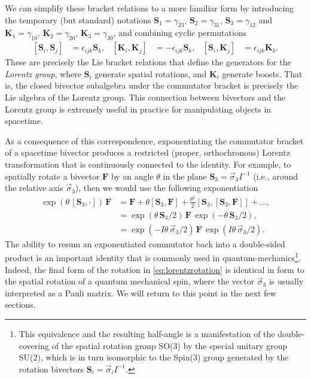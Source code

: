 \documentclass[1p,sort&compress]{elsarticle}
\numberwithin{equation}{section}
\newcommand{\rv}[1]{\vec{#1}}
\newcommand{\bv}[1]{\mathbf{#1}}
\begin{document}
We can simplify these bracket relations to a more familiar form by introducing the temporary (but standard) notations $\bv{S}_1 = \gamma_{23}$, $\bv{S}_2 = \gamma_{31}$, $\bv{S}_3 = \gamma_{12}$ and $\bv{K}_1 = \gamma_{10}$, $\bv{K}_2 = \gamma_{20}$, $\bv{K}_3 = \gamma_{30}$, and combining cyclic permutations
\begin{align}\label{eq:lorentzbrackets}
  [\bv{S}_i,\bv{S}_j] &= \epsilon_{ijk} \bv{S}_k, & [\bv{K}_i,\bv{K}_j] &= -\epsilon_{ijk} \bv{S}_k, & [\bv{S}_i,\bv{K}_j] &= \epsilon_{ijk} \bv{K}_k.
\end{align}
These are precisely the Lie bracket relations that define the generators for the \emph{Lorentz group}, where $\bv{S}_i$ generate spatial rotations, and $\bv{K}_i$ generate boosts.  That is, the closed bivector subalgebra under the commutator bracket is precisely the Lie algebra of the Lorentz group.  This connection between bivectors and the Lorentz group is extremely useful in practice for manipulating objects in spacetime.

As a consequence of this correspondence, exponentiating the commutator bracket of a spacetime bivector produces a restricted (proper, orthochronous) Lorentz transformation that is continuously connected to the identity.  For example, to spatially rotate a bivector $\bv{F}$ by an angle $\theta$ in the plane $\bv{S}_3 = \rv{\sigma}_3 I^{-1}$ (i.e., around the relative axis $\rv{\sigma}_3$), then we would use the following exponentiation
\begin{align}\label{eq:lorentzrotation}
  \exp(\theta\, [\bv{S}_3,\cdot])\,\bv{F} &= \bv{F} + \theta[\bv{S}_3,\bv{F}] + \frac{\theta^2}{2}[\bv{S}_3,[\bv{S}_3,\bv{F}]] + \dots, \\
  &= \exp(\theta\, \bv{S}_3 /2)\,\bv{F}\,\exp(-\theta\,\bv{S}_3/2), \nonumber \\
  &= \exp(-I\theta\, \rv{\sigma}_3 /2)\,\bv{F}\,\exp(I\theta\,\rv{\sigma}_3/2). \nonumber
\end{align}
The ability to resum an exponentiated commutator back into a double-sided product is an important identity that is commonly used in quantum-mechanics\footnote{This equivalence and the resulting half-angle is a manifestation of the double-covering of the spatial rotation group SO(3) by the special unitary group SU(2), which is in turn isomorphic to the Spin(3) group generated by the rotation bivectors $\bv{S}_i = \rv{\sigma}_i I^{-1}$.}.  Indeed, the final form of the rotation in \eqref{eq:lorentzrotation} is identical in form to the spatial rotation of a quantum mechanical spin, where the vector $\rv{\sigma}_3$ is usually interpreted as a Pauli matrix.  We will return to this point in the next few sections.  
\end{document}
